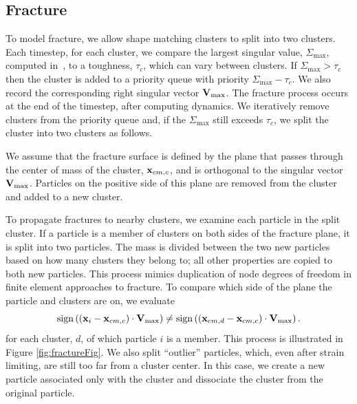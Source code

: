 \documentclass[conference]{acmsiggraph}
\begin{document}
\subsection{Fracture}
\label{sec:Fracture}
To model fracture, we allow shape matching clusters to split into two clusters.  Each timestep, for each cluster,
we compare the largest singular value, $\Sigma_{\max}$, computed in~, to a toughness, $\tau_c$, which
can vary between clusters.  
If $\Sigma_{\max} > \tau_c$ then the cluster is added to a priority queue with priority $\Sigma_{\max} - \tau_c$.  We also
record the corresponding right singular vector $\mathit{\mathbf{V}}_{\max}$.  The fracture process occurs 
at the end of the timestep, after computing dynamics.  We iteratively remove
clusters from the priority queue and, if the $\Sigma_{\max}$ still exceeds $\tau_c$, we split the cluster into two clusters
as follows.

We assume that the fracture surface is defined by the plane that passes through the center of mass of the 
cluster, $\mathit{\mathbf{x}}_{cm,c}$, and is orthogonal to the singular vector $\mathit{\mathbf{V}}_{\max}$.  Particles on the positive 
 side of this plane are removed from the cluster and added to a new cluster.  
 
To propagate fractures to nearby clusters, we examine each particle in the split cluster.  If a particle is a member of clusters on both sides of the fracture plane, it is split into two particles.  The mass is divided between the two new particles based on how many clusters they belong to; all other properties are copied to both new particles.  This process mimics duplication of node degrees of freedom in finite element approaches to fracture.  To compare which side of the plane the particle and clusters are on, we evaluate
\begin{equation}
\sign{\left(\B{x}_i-\B{x}_{cm,c}\right)\cdot \B{V}_{\max}} \neq %
\sign{\left(\B{x}_{cm,d}-\B{x}_{cm,c}\right)\cdot \B{V}_{\max}}.
\end{equation} 
for each cluster, $d$, of which particle $i$ is a member.  This process is illustrated in Figure \ref{fig:fractureFig}.
We also split ``outlier'' particles, which, even after strain limiting, are still too far from a cluster center.  
In this case, we create a new particle associated only with the cluster and dissociate the cluster from the original particle.
\end{document}
